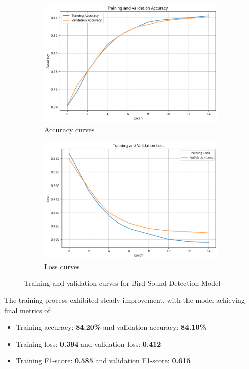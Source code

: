 \begin{figure}[h!]
      \centering
      \begin{subfigure}{\textwidth}
            \includegraphics[width=\textwidth]{images/det_acc.png}
            \caption{Accuracy curves}
      \end{subfigure}
      \begin{subfigure}{\textwidth}
            \includegraphics[width=\textwidth]{images/det_loss.png}
            \caption{Loss curves}
      \end{subfigure}
      \caption{Training and validation curves for Bird Sound Detection Model}
      \label{fig:training_curves}
\end{figure}

The training process exhibited steady improvement, with the model achieving final metrics of:
\begin{itemize}
      \item Training accuracy: \textbf{84.20\%} and validation accuracy: \textbf{84.10\%}
            \item Training loss: \textbf{0.394} and validation loss: \textbf{0.412}
            \item Training F1-score: \textbf{0.585} and validation F1-score: \textbf{0.615}
      \end{itemize}

